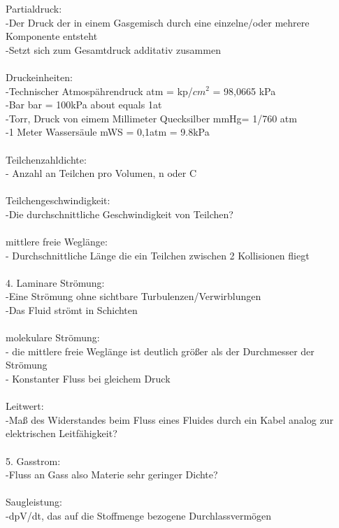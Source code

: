 	   Partialdruck:\\
	   	-Der Druck der in einem Gasgemisch durch eine einzelne/oder mehrere Komponente entsteht\\
		-Setzt sich zum Gesamtdruck additativ zusammen\\
\\
	   Druckeinheiten:\\
	   	-Technischer Atmospährendruck atm = kp/$cm^2$ = 98,0665 kPa \\
		-Bar bar = 100kPa about equals 1at\\
		-Torr, Druck von eimem Millimeter Quecksilber mmHg= 1/760 atm\\
		-1 Meter Wassersäule mWS = 0,1atm = 9.8kPa\\
\\
	   Teilchenzahldichte:\\
	   	- Anzahl an Teilchen pro Volumen, n oder C\\
\\
	   Teilchengeschwindigkeit:\\
		-Die durchschnittliche Geschwindigkeit von Teilchen?\\
\\
	   mittlere freie Weglänge:\\
	   	- Durchschnittliche Länge die ein Teilchen zwischen 2 Kollisionen fliegt\\
\\
	4. Laminare Strömung:\\
		-Eine Strömung ohne sichtbare Turbulenzen/Verwirblungen\\
		-Das Fluid strömt in Schichten\\
\\
	   molekulare Strömung:\\
		- die mittlere freie Weglänge ist deutlich größer als der Durchmesser der Strömung\\
		- Konstanter Fluss bei gleichem Druck\\
\\
	   Leitwert:\\
		-Maß des Widerstandes beim Fluss eines Fluides durch ein Kabel analog zur elektrischen Leitfähigkeit?\\ 
\\
	5. Gasstrom: \\
		-Fluss an Gass also Materie sehr geringer Dichte?\\
\\
	   Saugleistung:\\
		-dpV/dt, das auf die Stoffmenge bezogene Durchlassvermögen\\

